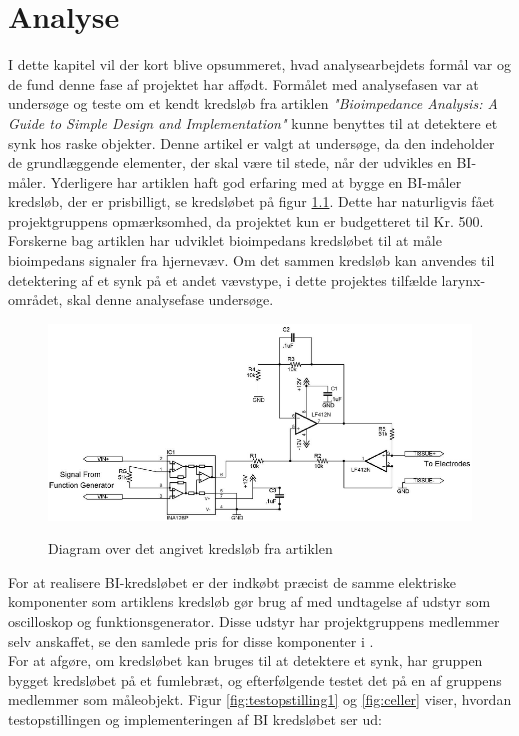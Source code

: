 \chapter{Analyse}

 
I dette kapitel vil der kort blive opsummeret, hvad analysearbejdets formål var og de fund denne fase af projektet har affødt. Formålet med analysefasen var  at undersøge og teste om et kendt kredsløb fra artiklen \textit{"Bioimpedance Analysis: A Guide to Simple Design and Implementation"} kunne benyttes til at detektere et synk hos raske objekter. Denne artikel er valgt at undersøge, da den indeholder de grundlæggende elementer, der skal være til stede, når der udvikles en BI-måler. Yderligere har artiklen haft god erfaring med at bygge en BI-måler kredsløb, der er prisbilligt, se kredsløbet på figur \ref{fig:BIdiagram}. Dette har naturligvis fået projektgruppens opmærksomhed, da projektet kun er budgetteret til Kr. 500.   Forskerne bag artiklen har udviklet bioimpedans kredsløbet til at måle bioimpedans signaler fra hjernevæv. Om det sammen kredsløb kan anvendes til detektering af et synk på et andet vævstype, i dette projektes tilfælde larynx-området, skal denne analysefase undersøge. \\

\begin{figure}[H]
\centering
{\includegraphics[width=\linewidth]
{Figure/BIdiagram}}
\caption{Diagram over det angivet kredsløb fra artiklen\cite{Aroom2009}}
\label{fig:BIdiagram}
\end{figure}

For at realisere BI-kredsløbet er der indkøbt præcist de samme elektriske komponenter som artiklens kredsløb gør brug af med undtagelse af udstyr som oscilloskop og funktionsgenerator. Disse udstyr har projektgruppens medlemmer selv anskaffet, se den samlede pris for disse komponenter i . \\
\pagebreak
For at afgøre, om kredsløbet kan bruges til at detektere et synk, har gruppen bygget kredsløbet på et fumlebræt, og efterfølgende testet det på en af gruppens medlemmer som måleobjekt. Figur \ref{fig:testopstilling1} og \ref{fig:celler} viser, hvordan testopstillingen og implementeringen af BI kredsløbet ser ud:

